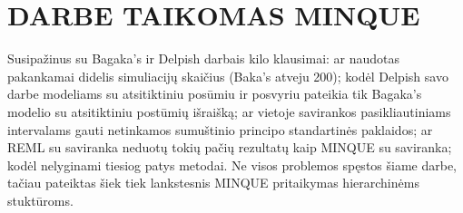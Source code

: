 \documentclass[11pt,a4paper]{article}
\begin{document}
%

\newpage
\section{DARBE TAIKOMAS MINQUE} \label{sec:hlmminque}
\indent Susipažinus su Bagaka's ir Delpish darbais kilo klausimai: ar naudotas pakankamai didelis simuliacijų skaičius (Baka's atveju 200); kodėl Delpish savo darbe modeliams su atsitiktiniu posūmiu ir posvyriu pateikia tik Bagaka's modelio su atsitiktiniu postūmių išraišką; ar vietoje savirankos pasikliautiniams intervalams gauti netinkamos sumuštinio principo standartinės paklaidos; ar REML su saviranka neduotų tokių pačių rezultatų kaip MINQUE su saviranka; kodėl nelyginami tiesiog patys metodai. Ne visos problemos spęstos šiame darbe, tačiau pateiktas šiek tiek lankstesnis MINQUE pritaikymas hierarchinėms stuktūroms. 
\end{document}
